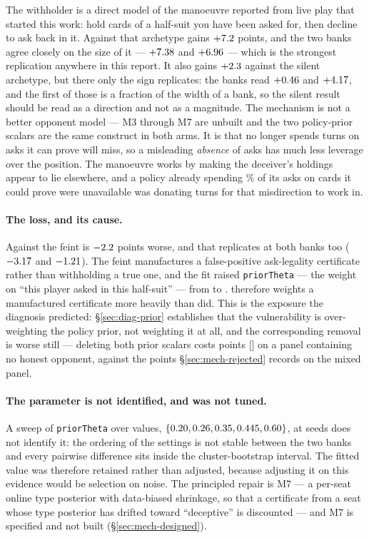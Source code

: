 The withholder is a direct model of the manoeuvre reported from live play that
started this work: hold cards of a half-suit you have been asked for, then
decline to ask back in it. Against that archetype \vfive{} gains
$+7.2$ points, and the two banks agree closely on the size of
it --- $+7.38$ and $+6.96$ --- which is the
strongest replication anywhere in this report. It also gains
$+2.3$ against the silent archetype, but there only the sign
replicates: the banks read $+0.46$ and $+4.17$, and
the first of those is a fraction of the width of a bank, so the silent result
should be read as a direction and not as a magnitude. The mechanism is not a better
opponent model --- M3 through M7 are unbuilt and the two policy-prior scalars are
the same construct in both arms. It is that \vfive{} no longer spends turns on
asks it can prove will miss, so a misleading \emph{absence} of asks has much less
leverage over the position. The manoeuvre works by making the deceiver's holdings
appear to lie elsewhere, and a policy already spending \numFourDeadAsk\% of its
asks on cards it could prove were unavailable was donating turns for that
misdirection to work in.

\paragraph{The loss, and its cause.} Against the feint \vfive{} is
$-2.2$ points worse, and that replicates at both banks too
($-3.17$ and $-1.21$). The
feint manufactures a false-positive ask-legality certificate rather than
withholding a true one, and the fit raised \texttt{priorTheta} --- the weight on
``this player asked in this half-suit'' --- from \numPriorThetaFour{} to
\numPriorThetaFive{}. \vfive{} therefore weights a manufactured certificate more
heavily than \vfour{} did. This is the exposure the diagnosis predicted:
\S\ref{sec:diag-prior} establishes that the vulnerability is over-weighting the
policy prior, not weighting it at all, and the corresponding removal is worse
still --- deleting both prior scalars costs \numPriorDeleteCost{} points
[\numPriorDeleteCI] on a panel containing no honest opponent, against the
\numAgnosticCost{} points \S\ref{sec:mech-rejected} records on the mixed panel.

\paragraph{The parameter is not identified, and was not tuned.} A sweep of
\texttt{priorTheta} over \numThetaSweepN{} values, $\{0.20, 0.26, 0.35, 0.445, 0.60\}$, at
\numDecSeeds{} seeds does not identify it: the ordering of the settings is not
stable between the two banks and every pairwise difference sits inside the
cluster-bootstrap interval. The fitted value was therefore retained rather than
adjusted, because adjusting it on this evidence would be selection on noise. The
principled repair is M7 --- a per-seat online type posterior with data-biased
shrinkage, so that a certificate from a seat whose type posterior has drifted
toward ``deceptive'' is discounted --- and M7 is specified and not built
(\S\ref{sec:mech-designed}).


